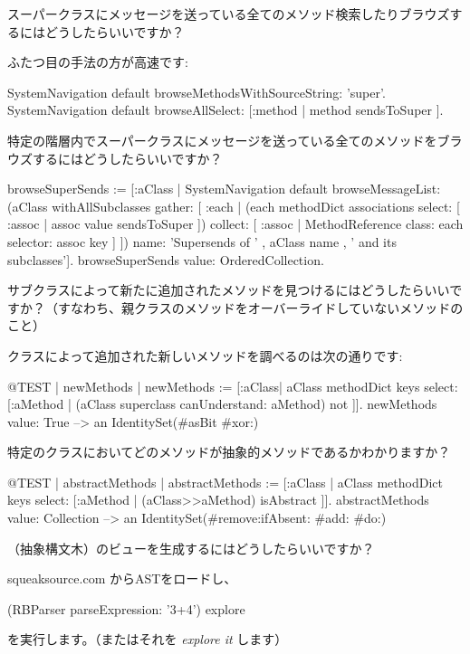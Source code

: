 \documentclass[a4paper,10pt,twoside]{book}
\begin{document}
\begin{faq}
スーパークラスにメッセージを送っている全てのメソッド検索したりブラウズするにはどうしたらいいですか？
\end{faq}
\answer
ふたつ目の手法の方が高速です:
\begin{code}{}
SystemNavigation default browseMethodsWithSourceString: 'super'.
SystemNavigation default browseAllSelect: [:method | method sendsToSuper ].
\end{code}

\begin{faq}
特定の階層内でスーパークラスにメッセージを送っている全てのメソッドをブラウズするにはどうしたらいいですか？
\end{faq}
\answer
\begin{code}{}
browseSuperSends := [:aClass | SystemNavigation default
	browseMessageList: (aClass withAllSubclasses gather: [ :each |
		(each methodDict associations
			select: [ :assoc | assoc value sendsToSuper ])
				collect: [ :assoc | MethodReference class: each selector: assoc key ] ])
	name: 'Supersends of ' , aClass name , ' and its subclasses'].
browseSuperSends value: OrderedCollection.
\end{code}

\begin{faq}
サブクラスによって新たに追加されたメソッドを見つけるにはどうしたらいいですか？（すなわち、親クラスのメソッドをオーバーライドしていないメソッドのこと）
\end{faq}
\answer
{}クラスによって追加された新しいメソッドを調べるのは次の通りです:
\begin{code}{@TEST | newMethods |}
newMethods := [:aClass| aClass methodDict keys select:
	[:aMethod | (aClass superclass canUnderstand: aMethod) not ]].
newMethods value: True --> an IdentitySet(#asBit #xor:)
\end{code}

\begin{faq}
特定のクラスにおいてどのメソッドが抽象的メソッドであるかわかりますか？
\end{faq}
\answer
\begin{code}{@TEST | abstractMethods |}
abstractMethods :=
	[:aClass | aClass methodDict keys select:
		[:aMethod | (aClass>>aMethod) isAbstract ]].
abstractMethods value: Collection --> an IdentitySet(#remove:ifAbsent: #add: #do:)
\end{code}

\begin{faq}
 （抽象構文木）のビューを生成するにはどうしたらいいですか？
\end{faq}
\answer
squeaksource.com からASTをロードし、
\begin{code}{}
(RBParser parseExpression: '3+4') explore
\end{code}
を実行します。（またはそれを \emph{explore it} します）
\end{document}
